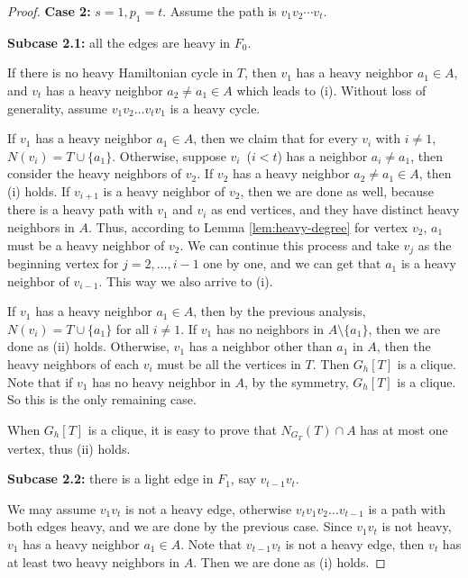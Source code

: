 \documentclass[10pt,a4paper]{amsart}
\begin{document}
\begin{proof}
     \noindent
    \textbf{Case 2:} $s=1, p_1 = t$.
    Assume the path is $v_1v_2\cdots v_t$.
    
    \textbf{Subcase 2.1:} all the edges are heavy in $F_0$. %
    
    If there is no heavy Hamiltonian cycle in $T$, then $v_1$ has a heavy neighbor $a_1 \in A$, and $v_t$ has a heavy neighbor $a_2 \neq a_1 \in A$ which leads to (i).
    Without loss of generality, assume $v_1v_2\ldots v_tv_1$ is a heavy cycle.
    
    If $v_1$ has a heavy neighbor $a_1 \in A$, 
    then we claim that for every $v_i$ with $i\neq 1$, $N(v_i)=T\cup \{a_1\}$.
    Otherwise, suppose $v_i$~($i < t$) has a neighbor $a_i \neq a_1$, then consider the heavy neighbors of $v_2$.
    If $v_2$ has a heavy neighbor $a_2 \neq a_1 \in A$, then (i) holds.
    If $v_{i+1}$ is a heavy neighbor of $v_2$, then we are done as well, because there is a heavy path with $v_1$ and $v_i$ as end vertices, and they have distinct heavy neighbors in $A$.
    Thus, according to 
    Lemma \ref{lem:heavy-degree} for vertex $v_2$, $a_1$ must be a heavy neighbor of $v_2$.
    We can continue this process and take $v_j$ as the beginning vertex for $j=2,\dots,i-1$ one by one, and we can get that $a_1$ is a heavy neighbor of $v_{i-1}$. This way we also arrive to (i).

    If $v_1$ has a heavy neighbor $a_1 \in A$, then by the previous analysis, $N(v_i) = T \cup \{a_1\}$ for all $i \neq 1$.
    If $v_1$ has no neighbors in $A\setminus \{a_1\}$, then we are done as (ii) holds.
    Otherwise, $v_1$ has a neighbor other than $a_1$ in $A$, then the heavy neighbors of each $v_i$ must be all the vertices in $T$.
    Then $G_h[T]$ is a clique.
    Note that if $v_1$ has no heavy neighbor in $A$, by the symmetry, $G_h[T]$ is a clique.
    So this is the only remaining case.

    When $G_h[T]$ is a clique, it is easy to prove that $N_{G_T}(T) \cap A$ has at most one vertex, thus (ii) holds.

    \textbf{Subcase 2.2:} there is a light edge in $F_1$, say $v_{t-1}v_{t}$. 

    We may assume $v_1v_t$ is not a heavy edge, otherwise $v_tv_1v_2\dots v_{t-1}$ is a path with both edges heavy, and we are done by the previous case.
    Since $v_1v_t$ is not heavy, $v_1$ has a heavy neighbor $a_1 \in A$.
    Note that $v_{t-1}v_{t}$ is not a heavy edge, then $v_{t}$ has at least two heavy neighbors in $A$.
    Then we are done as (i) holds.


\end{proof}
\end{document}
